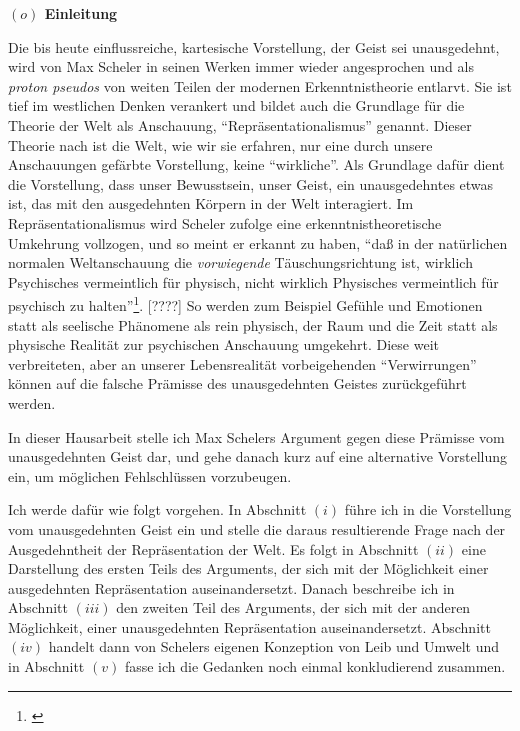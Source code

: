 \documentclass[a4paper, 12pt]{article}
\begin{document}
\begin{onehalfspace} 

\noindent\textbf{$(o)$ Einleitung}

\noindent Die bis heute einflussreiche, kartesische Vorstellung, der Geist sei unausgedehnt, wird von Max Scheler in seinen Werken immer wieder angesprochen und als \emph{proton pseudos} von weiten Teilen der modernen Erkenntnistheorie entlarvt. Sie ist tief im westlichen Denken verankert und bildet auch die Grundlage für die Theorie der Welt als Anschauung, "`Repräsentationalismus"' genannt. Dieser Theorie nach ist die Welt, wie wir sie erfahren, nur eine durch unsere Anschauungen gefärbte Vorstellung, keine "`wirkliche"'. Als Grundlage dafür dient die Vorstellung, dass unser Bewusstsein, unser Geist, ein unausgedehntes etwas ist, das mit den ausgedehnten Körpern in der Welt interagiert. Im Repräsentationalismus wird Scheler zufolge eine erkenntnistheoretische Umkehrung vollzogen, und so meint er erkannt zu haben, "`daß in der natürlichen normalen Weltanschauung die \emph{vorwiegende} Täuschungsrichtung ist, wirklich Psychisches vermeintlich für physisch, nicht wirklich Physisches vermeintlich für psychisch zu halten"'\footnote{\Cite[Siehe][S. 257]{scheler-idole}}. [????] So werden zum Beispiel Gefühle und Emotionen statt als seelische Phänomene als rein physisch, der Raum und die Zeit statt als physische Realität zur psychischen Anschauung umgekehrt. Diese weit verbreiteten, aber an unserer Lebensrealität vorbeigehenden "`Verwirrungen"' können auf die falsche Prämisse des unausgedehnten Geistes zurückgeführt werden. 

In dieser Hausarbeit stelle ich Max Schelers Argument gegen diese Prämisse vom unausgedehnten Geist dar, und gehe danach kurz auf eine alternative Vorstellung ein, um möglichen Fehlschlüssen vorzubeugen.

\vspace{3mm}
Ich werde dafür wie folgt vorgehen. In Abschnitt $(i)$ führe ich in die Vorstellung vom unausgedehnten Geist ein und stelle die daraus resultierende Frage nach der Ausgedehntheit der Repräsentation der Welt. Es folgt in Abschnitt $(ii)$ eine Darstellung des ersten Teils des Arguments, der sich mit der Möglichkeit einer ausgedehnten Repräsentation auseinandersetzt. Danach beschreibe ich in Abschnitt $(iii)$ den zweiten Teil des Arguments, der sich mit der anderen Möglichkeit, einer unausgedehnten Repräsentation auseinandersetzt. Abschnitt $(iv)$ handelt dann von Schelers eigenen Konzeption von Leib und Umwelt und in Abschnitt $(v)$ fasse ich die Gedanken noch einmal konkludierend zusammen.


\end{onehalfspace}
\end{document}
